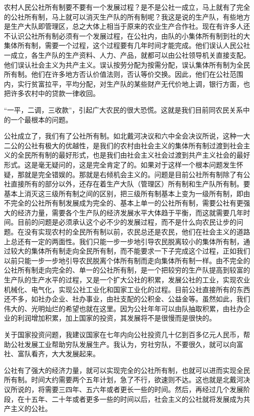 农村人民公社所有制要不要有一个发展过程？是不是公社一成立，马上就有了完全的公社所有制，马上就可以消灭生产队的所有制呢？我这是说的生产队，有些地方是生产大队即管理区，总之大体上相当于原来的农业生产合作社。现在有许多人还不认识公社所有制必须有一个发展过程，在公社内，由队的小集体所有制到社的大集体所有制，需要一个过程，这个过程要有几年时间才能完成。他们误认人民公社一成立，各生产队的生产资料、人力、产品，就都可以由公社领导机关直接支配。他们误认社会主义为共产主义。误认按劳分配为按需分配，误认集体所有制为全民所有制。他们在许多地方否认价值法则，否认等价交换。因此，他们在公社范围内，实行贫富拉平，平均分配，对生产队的某些财产无代价地上调，银行方面，也把许多农村中的贷款一律收回。

“一平，二调，三收款”，引起广大农民的很大恐慌。这就是我们目前同农民关系中的一个最根本的问题。

公社成立了，我们有了公社所有制。如北戴河决议和六中全会决议所说，这种一大二公的公社有极大的优越性，是我们的农村由社会主义的集体所有制过渡到社会主义的全民所有制的最好形式，也是我们由社会主义社会过渡到共产主义社会的最好形式。这是毫无疑问的，这是完全肯定了的。如果对于这样一个根本问题发生怀疑，那就是完全错娱的。那就是右倾机会主义的。问题是目前公社所有制除了有公社直接所有的部分以外，还存在着生产大队（管理区）所有制和生产队所有制。要基本上消灭这三级所有制之间的区别，把三级所有制基本上变为一级所有制，即由不完全的公社所有制发展成为完全的、基本上单一的公社所有制，需要公社有更强大的经济力量，需要各个生产队的经济发展水平大体趋于平衡，而这就需要几年时间。目前的问题是必须承认这个必不少的发展过程，而不是什么向农民让步的问题。在没有实现农村的全民所有制以前，农民总还是农民，他们在社会主义的道路上总还有一定的两面性。我们只能一步一步地引导农民脱离较小的集体所有制，通过较大的集体所有制走向全民所有制，而不能要求一下子完成这个过程，正如我们以前只能一步一步地引导农民脱离个体所有制而走向集体所有制一样。由不完全的公社所有制走向完全的、单一的公社所有制，是一个把较穷的生产队提高到较富的生产队的生产水平的过程，又是一个扩大公社的积累，发展公社的工业，实现农业机械化、电气化，实现公社工业化和国家工业化的过程。目前公社直接所有的东西还不多，如社办企业、社办事业，由社支配的公积金、公益金等。虽然如此，我们伟大的、光明灿烂的希望也就在这里。因为公社年年可以由队抽取积累，由社办企业的利润增加积累，加上国家的投资，其发展将不是很慢而是很快的。

关于国家投资问题，我建议国家在七年内向公社投资几十亿到百多亿元人民币，帮助公社发展工业帮助穷队发展生产。我认为，穷社穷队，不要很久，就可以向富社、富队看齐，大大发展起来。

公社有了强大的经济力量，就可以实现完全的公社所有制，也就可以进而实现全民所有制。时间大约需要两个五年计划，急了不行，欲速则不达。这也就是北戴河决议所说的，将需要三四年、五六年或者更长一些的时间。然后，再经过几个发展阶段，在十五年、二十年或者更多一些的时间以后，社会主义的公社就将发展成为共产主义的公社。


